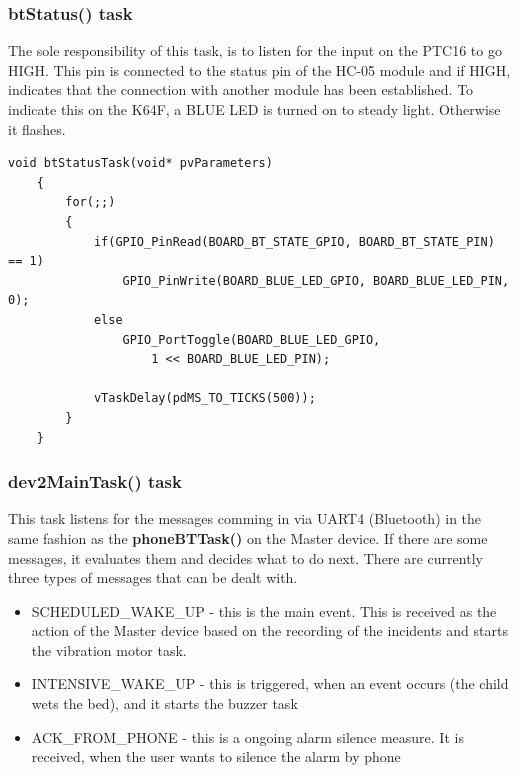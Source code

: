 \documentclass[12pt,a4paper]{article}
\begin{document}
    \subsubsection*{btStatus() task}
    The sole responsibility of this task, is to listen for the input on the PTC16 to go HIGH. This pin is connected to the status pin of the HC-05 module and if HIGH, indicates that the connection with another module has been established. To indicate this on the K64F, a BLUE LED is turned on to steady light. Otherwise it flashes. 
    
    \begin{lstlisting}[label={lst:btStatus}, caption=btStatus() task]
    void btStatusTask(void* pvParameters)
    {
        for(;;)
        {
            if(GPIO_PinRead(BOARD_BT_STATE_GPIO, BOARD_BT_STATE_PIN) == 1)
                GPIO_PinWrite(BOARD_BLUE_LED_GPIO, BOARD_BLUE_LED_PIN, 0);
            else
                GPIO_PortToggle(BOARD_BLUE_LED_GPIO, 
                    1 << BOARD_BLUE_LED_PIN);

            vTaskDelay(pdMS_TO_TICKS(500));
        }
    }
    \end{lstlisting}
    
    \subsubsection*{dev2MainTask() task}
    This task listens for the messages comming in via UART4 (Bluetooth) in the same fashion as the {\bfseries phoneBTTask()} on the Master device. If there are some messages, it evaluates them and decides what to do next. There are currently three types of messages that can be dealt with.\\
    
    \begin{itemize}[topsep=4pt, itemsep=1pt]
     \item SCHEDULED\_WAKE\_UP - this is the main event. This is received as the action of the Master device based on the recording of the incidents and starts the vibration motor task.
     \item INTENSIVE\_WAKE\_UP - this is triggered, when an event occurs (the child wets the bed), and it starts the buzzer task
     \item ACK\_FROM\_PHONE - this is a ongoing alarm silence measure. It is received, when the user wants to silence the alarm by phone
    \end{itemize}
    
\end{document}
